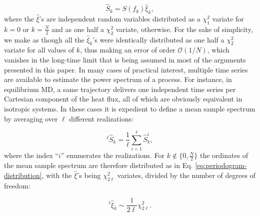 \begin{equation}
\hat{S}_{k} = S \left(f_k\right)\hat{\xi}_{k}, \label{eq:periodogram-distribution}
\end{equation}
where the $\hat{\xi}$'s are independent random variables distributed as a $\chi_1^2$ variate for $k=0$ or $k=\frac{N}{2}$ and as one half a $\chi_2^2$ variate, otherwise. For the sake of simplicity, we make as though all the $\hat{\xi}_k$'s were identically distributed as one half a $\chi_2^2$ variate for all values of $k$, thus making an error of order $\mathcal{O}(1/N)$, which vanishes in the long-time limit that is being assumed in most of the arguments presented in this paper. In many cases of practical interest, multiple time series are available to estimate the power spectrum of a process. For instance, in equilibrium MD, a same trajectory delivers one independent time series per Cartesian component of the heat flux, all of which are obviously equivalent in isotropic systems. In these cases it is expedient to define a mean sample spectrum by averaging over $\ell$ different realizations:

\begin{equation}
{^{\ell}\hat{S}}_{k}=\frac{1}{\ell}\sum_{i=1}^{\ell}{\hat{S}}_{k}^{i}, \label{eq:mean-periodogram}
\end{equation}
where the index ``$i$'' enumerates the realizations. For $k \notin \{ 0,\frac{N}{2} \}$ the ordinates of the mean sample spectrum are therefore distributed as in Eq. \eqref{eq:periodogram-distribution}, with the $\hat\xi$'s being $\chi_{2\ell}^2$ variates, divided by the number of degrees of freedom:

\begin{equation}
^\ell{\hat\xi}_{k}\sim\frac{1}{2\ell}\chi_{2\ell}^{2}.\label{eq:chi-square-nu}
\end{equation}

